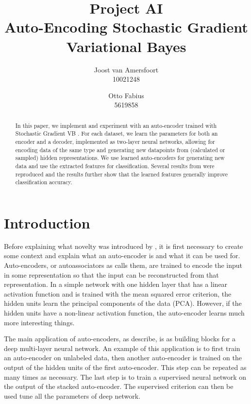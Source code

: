 \documentclass{article}
\begin{document}
\title{Project AI \\ Auto-Encoding Stochastic Gradient Variational Bayes}
\author{	
	Joost van Amersfoort \\ 10021248  
	\and
	Otto Fabius \\ 5619858
	}
\maketitle

\begin{abstract}
In this paper, we implement and experiment with an auto-encoder trained with Stochastic Gradient VB \cite{kingma2013auto}. For each dataset, we learn the parameters for both an encoder and a decoder, implemented as two-layer neural networks, allowing for encoding data of the same type and generating new datapoints from (calculated or sampled) hidden representations. We use learned auto-encoders for generating new data and use the extracted features for classification. Several results from \cite{kingma2013auto} were reproduced and the results further show that the learned features generally improve classification accuracy.
\end{abstract}

\section{Introduction}

Before explaining what novelty was introduced by \cite{kingma2013auto}, it is first necessary to create some context and explain what an auto-encoder is and what it can be used for. Auto-encoders, or autoassociators as \cite{bengio2009learning} calls them, are trained to encode the input in some representation so that the input can be reconstructed from that representation. In a simple network with one hidden layer that has a linear activation function and is trained with the mean squared error criterion, the hidden units learn the principal components of the data (PCA). However, if the hidden units have a non-linear activation function, the auto-encoder learns much more interesting things.

The main application of auto-encoders, as \cite{bengio2009learning} describe, is as building blocks for a deep multi-layer neural network. An example of this application is to first train an auto-encoder on unlabeled data, then another auto-encoder is trained on the output of the hidden units of the first auto-encoder. This step can be repeated as many times as necessary. The last step is to train a supervised neural network on the output of the stacked auto-encoder. The supervised criterion can then be used tune all the parameters of deep network. 
\end{document}
